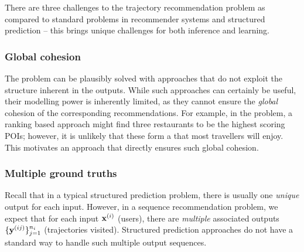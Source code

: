 There are three challenges to the trajectory recommendation problem as compared to
standard problems in recommender systems and structured prediction --
this brings unique challenges for both inference and learning.


\subsubsection{Global cohesion}
The {\seqrec} problem can be plausibly solved with approaches that do not exploit the structure inherent in the outputs. %
While such approaches can certainly be useful,
their modelling power is inherently limited,
as
they cannot ensure the \emph{global} cohesion of the corresponding recommendations. %
For example, in the {\trajrec} problem, a ranking based approach %
might find three restaurants to be the highest scoring POIs;
however, it is unlikely that these form a {\trajectory} that most travellers will enjoy.
This motivates an approach %
that directly ensures such global cohesion.


\subsubsection{Multiple ground truths}
%
Recall that in a typical structured prediction problem,
there is usually one \emph{unique} output for each input.
However, in a sequence recommendation problem,
we expect that for each input $\mathbf{x}^{({i})}$ (\eg users),
there are \emph{multiple} associated outputs
$\{ \mathbf{y}^{({ij})} \}_{j=1}^{n_i}$ (\ie trajectories visited).
Structured prediction approaches do not have a standard way to handle such multiple output sequences.


